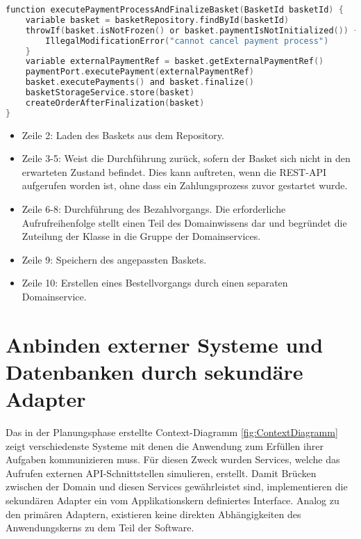\begin{minipage}{\linewidth} %
	\begin{lstlisting}[caption={Ausführung des Bezahlvorgangs in einem Domainservice}, label={lst:domainservice}, language=Kotlin]
function executePaymentProcessAndFinalizeBasket(BasketId basketId) {
	variable basket = basketRepository.findById(basketId)
	throwIf(basket.isNotFrozen() or basket.paymentIsNotInitialized()) {
		IllegalModificationError("cannot cancel payment process")
	}
	variable externalPaymentRef = basket.getExternalPaymentRef()
	paymentPort.executePayment(externalPaymentRef)
	basket.executePayments() and basket.finalize()
	basketStorageService.store(basket)
	createOrderAfterFinalization(basket)
}
	\end{lstlisting}
	\begin{itemize}[noitemsep,nolistsep]
		\item Zeile 2: Laden des Baskets aus dem Repository.
		\item Zeile 3-5: Weist die Durchführung zurück, sofern der Basket sich nicht in den erwarteten Zustand befindet. Dies kann auftreten, wenn die REST-API aufgerufen worden ist, ohne dass ein Zahlungsprozess zuvor gestartet wurde.
		\item Zeile 6-8: Durchführung des Bezahlvorgangs. Die erforderliche Aufrufreihenfolge stellt einen Teil des Domainwissens dar und begründet die Zuteilung der Klasse in die Gruppe der Domainservices.
		\item Zeile 9: Speichern des angepassten Baskets.
		\item Zeile 10: Erstellen eines Bestellvorgangs durch einen separaten Domainservice.
	\end{itemize}
\end{minipage}

\section{Anbinden externer Systeme und Datenbanken durch sekundäre Adapter}

Das in der Planungsphase erstellte Context-Diagramm \ref{fig:ContextDiagramm} zeigt verschiedenste Systeme mit denen die Anwendung zum Erfüllen ihrer Aufgaben kommunizieren muss. Für diesen Zweck wurden Services, welche das Aufrufen externen API-Schnittstellen simulieren, erstellt. Damit Brücken zwischen der Domain und diesen Services gewährleistet sind, implementieren die sekundären Adapter ein vom Applikationskern definiertes Interface. Analog zu den primären Adaptern, existieren keine direkten Abhängigkeiten des Anwendungskerns zu dem Teil der Software.

